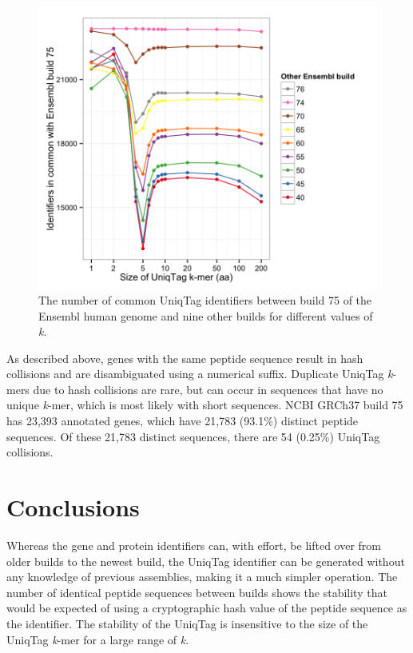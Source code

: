 \documentclass[
  12pt,
  oneside,
  openany]{book}
\begin{document}
\begin{figure}
\hypertarget{fig:ensemblk}{%
\centering
\includegraphics{uniqtag/k.png}
\caption[The number of common UniqTag identifiers between build 75 of the Ensembl human genome and nine other builds for different values of \emph{k}.]{The number of common UniqTag identifiers between build 75 of the Ensembl human genome and nine other builds for different values of \emph{k}.}\label{fig:ensemblk}
}
\end{figure}

As described above, genes with the same peptide sequence result in hash collisions and are disambiguated using a numerical suffix. Duplicate UniqTag \emph{k}-mers due to hash collisions are rare, but can occur in sequences that have no unique \emph{k}-mer, which is most likely with short sequences. NCBI GRCh37 build 75 has 23,393 annotated genes, which have 21,783 (93.1\%) distinct peptide sequences. Of these 21,783 distinct sequences, there are 54 (0.25\%) UniqTag collisions.

\hypertarget{conclusions-1}{%
\section{Conclusions}\label{conclusions-1}}

Whereas the gene and protein identifiers can, with effort, be lifted over from older builds to the newest build, the UniqTag identifier can be generated without any knowledge of previous assemblies, making it a much simpler operation. The number of identical peptide sequences between builds shows the stability that would be expected of using a cryptographic hash value of the peptide sequence as the identifier. The stability of the UniqTag is insensitive to the size of the UniqTag \emph{k}-mer for a large range of \emph{k}.
\end{document}
